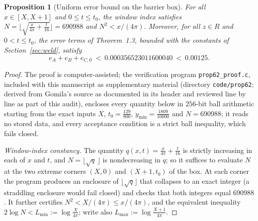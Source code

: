 \documentclass[11pt]{article}
\newtheorem{proposition}[theorem]{Proposition}
\theoremstyle{definition}
\begin{document}
\begin{proposition}[Uniform error bound on the barrier box]\label{prop:barriererr}
For all $x\in[X,X+1]$ and $0\le t\le t_0$, the window index satisfies
$N=\bigl\lfloor\sqrt{\frac{x}{4\pi}+\frac t{16}}\bigr\rfloor=690988$
and $N^2<x/(4\pi)$. Moreover, for all $z\in R$ and $0<t\le t_0$, the
error terms of Theorem~1.3, bounded with the constants of
Section~\ref{sec:weld}, satisfy
\begin{equation}\label{eq:barriererror}
e_A+e_B+e_{C,0}\ <\ 0.000356523011600040\ <\ 0.00125 .
\end{equation}
\end{proposition}

\begin{proof}
The proof is computer-assisted; the verification program
\texttt{prop62\_proof.c}, included with this manuscript as
supplementary material (directory \texttt{code/prop62}; derived
from Gomila's source as documented in its header and reviewed line
by line as part of this audit), encloses every quantity below in
$256$-bit ball arithmetic starting from the exact inputs $X$,
$t_0=\frac{129}{800}$, $y_{\min}=\frac{1809}{10000}$ and
$N=690988$; it reads no stored data, and every acceptance
condition is a strict ball inequality, which fails closed.

\emph{Window-index constancy.} The quantity
$q(x,t)=\frac{x}{4\pi}+\frac t{16}$ is strictly increasing in each
of $x$ and $t$, and $N=\lfloor\sqrt{q}\,\rfloor$ is nondecreasing
in $q$; so it suffices to evaluate $N$ at the two extreme corners
$(X,0)$ and $(X+1,t_0)$ of the box. At each corner the program
produces an enclosure of $\lfloor\sqrt q\rfloor$ that collapses to
an exact integer (a straddling enclosure would fail closed) and
checks that both integers equal $690988$. It further certifies
$N^2<X/(4\pi)\le x/(4\pi)$, and the equivalent inequality
$2\log N<L_{\min}:=\log\frac X{4\pi}$; write also
$L_{\max}:=\log\frac{X+1}{4\pi}$.


\end{proof}
\end{document}
